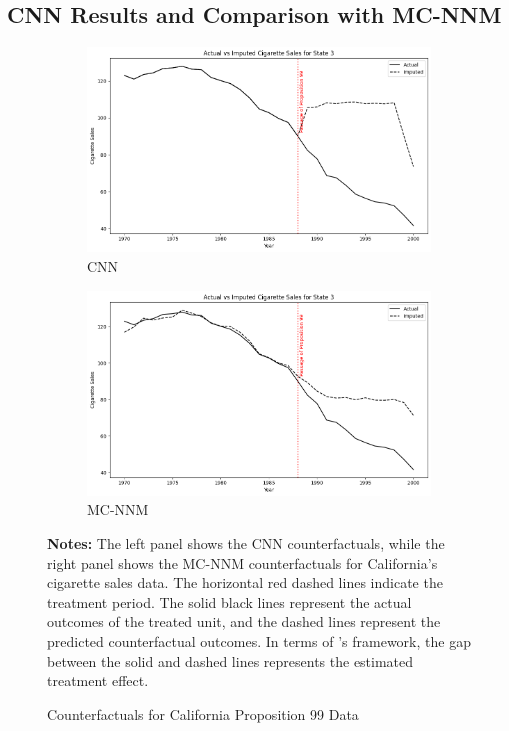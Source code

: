 \subsection{CNN Results and Comparison with MC-NNM}

\begin{figure}[htbp]
    \centering
        \begin{subfigure}[c]{0.45\textwidth}
        \includegraphics[width=\textwidth]{../figures/cnn-1.png}
        \caption{CNN}
        \label{fig:cnn}
    \end{subfigure}
    \begin{subfigure}[c]{0.45\textwidth}
        \includegraphics[width=\textwidth]{../figures/mc-nnm-1.png}
        \caption{MC-NNM }
        \label{fig:mcnnm}
    \end{subfigure}
    \caption{Counterfactuals for California Proposition 99 Data}
    \label{fig:main_results}
    \begin{minipage}{0.9\textwidth}
        \scriptsize
        \textbf{Notes:} The left panel shows the CNN counterfactuals, while the right panel shows the MC-NNM counterfactuals for California's cigarette sales data. The horizontal red dashed lines indicate the treatment period. The solid black lines represent the actual outcomes of the treated unit, and the dashed lines represent the predicted counterfactual outcomes.
        In terms of \textcite{rubin1974estimating}'s framework, the gap between the solid and dashed lines represents the estimated treatment effect.
    \end{minipage}
\end{figure}

